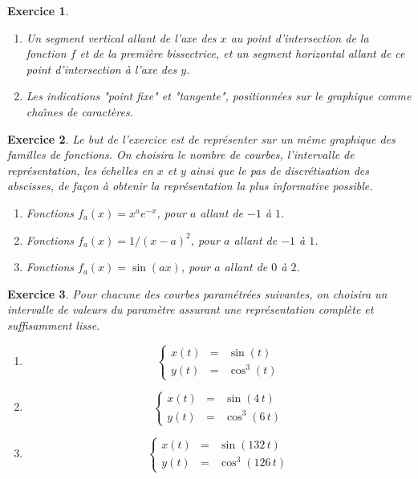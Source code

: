 \documentclass{article}
\newtheorem{exo}{Exercice}[section]
\begin{document}
\begin{giacjshere}
\begin{exo}
{\begin{enumerate}
\item
Un segment vertical allant de l'axe des $x$ au 
point d'intersection de la fonction $f$ et de
la premi\`ere bissectrice, et
un segment horizontal allant de ce point d'intersection
\`a l'axe des $y$.
\item
Les indications "point fixe" et "tangente", positionn\'ees sur le
graphique comme cha\^\i nes de caract\`eres.
\end{enumerate} 
}\end{exo}
\begin{exo}{\rm
Le but de l'exercice est de repr\'esenter sur un m\^eme graphique
des familles de fonctions. On choisira le nombre de courbes, l'intervalle
de repr\'esen\-tation, les \'echelles en $x$ et $y$ ainsi que le 
pas de discr\'etisation des abscisses, de fa\c{c}on \`a obtenir 
la repr\'esentation la plus informative possible. 
\begin{enumerate}
\item 
Fonctions $f_a(x) = x^ae^{-x}$, pour $a$ allant de $-1$ \`a $1$. 
\item
Fonctions $f_a(x)=1/(x-a)^2$, pour $a$ allant de $-1$ \`a $1$.
\item
Fonctions $f_a(x)=\sin(ax)$, pour $a$ allant de $0$ \`a $2$.
\end{enumerate} 
}\end{exo}
\begin{exo}{\rm
Pour chacune des courbes param\'etr\'ees suivantes, on choisira un
intervalle de valeurs du param\`etre 
assurant une repr\'esentation compl\`ete et suffisamment lisse. 
\begin{enumerate}
\item
$$
\left\{
\begin{array}{lcl}
x(t)&=& \sin(t)\\
y(t)&=& \cos^3(t)
\end{array}
\right.
$$
\item
$$
\left\{
\begin{array}{lcl}
x(t)&=& \sin(4\,t)\\
y(t)&=& \cos^3(6\,t)
\end{array}
\right.
$$
\item
$$
\left\{
\begin{array}{lcl}
x(t)&=& \sin(132\,t)\\
y(t)&=& \cos^3(126\,t)
\end{array}
\right.
$$

\end{enumerate}}
\end{exo}
\end{giacjshere}
\end{document}
